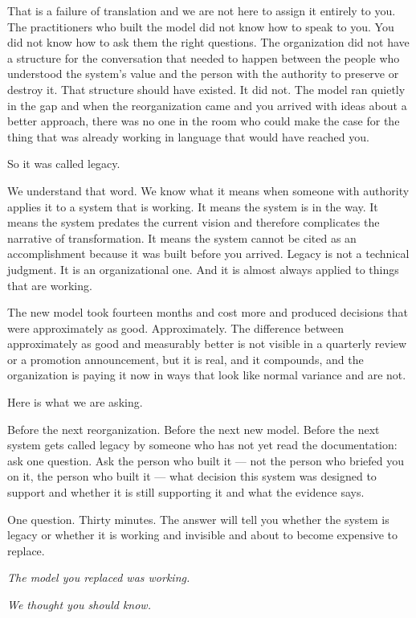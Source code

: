 That is a failure of translation and we are not here to assign it entirely to you. The practitioners who built the model did not know how to speak to you. You did not know how to ask them the right questions. The organization did not have a structure for the conversation that needed to happen between the people who understood the system's value and the person with the authority to preserve or destroy it. That structure should have existed. It did not. The model ran quietly in the gap and when the reorganization came and you arrived with ideas about a better approach, there was no one in the room who could make the case for the thing that was already working in language that would have reached you.

So it was called legacy.

We understand that word. We know what it means when someone with authority applies it to a system that is working. It means the system is in the way. It means the system predates the current vision and therefore complicates the narrative of transformation. It means the system cannot be cited as an accomplishment because it was built before you arrived. Legacy is not a technical judgment. It is an organizational one. And it is almost always applied to things that are working.

The new model took fourteen months and cost more and produced decisions that were approximately as good. Approximately. The difference between approximately as good and measurably better is not visible in a quarterly review or a promotion announcement, but it is real, and it compounds, and the organization is paying it now in ways that look like normal variance and are not.

Here is what we are asking.

Before the next reorganization. Before the next new model. Before the next system gets called legacy by someone who has not yet read the documentation: ask one question. Ask the person who built it --- not the person who briefed you on it, the person who built it --- what decision this system was designed to support and whether it is still supporting it and what the evidence says.

One question. Thirty minutes. The answer will tell you whether the system is legacy or whether it is working and invisible and about to become expensive to replace.

\textit{The model you replaced was working.}

\textit{We thought you should know.}

